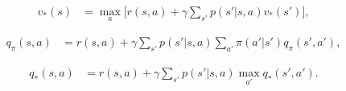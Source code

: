 \documentclass[a4paper,11pt]{article}
\numberwithin{equation}{section}
\theoremstyle{remark}
\begin{document}
\begin{align*}
	v_*(s) & = \max_{a} \Big[ r(s, a) + \gamma \sum_{s'} p(s' | s, a) v_*(s') \Big],
\end{align*}

\begin{align*}
	q_\pi(s, a) & = r(s, a) + \gamma \sum_{s'} p(s' | s, a) \sum_{a'} \pi(a' | s') q_\pi(s', a'),
\end{align*}

\begin{align*}
	q_*(s, a) & = r(s, a) + \gamma \sum_{s'} p(s' | s, a) \max_{a'} q_*(s', a').
\end{align*}
\end{document}
